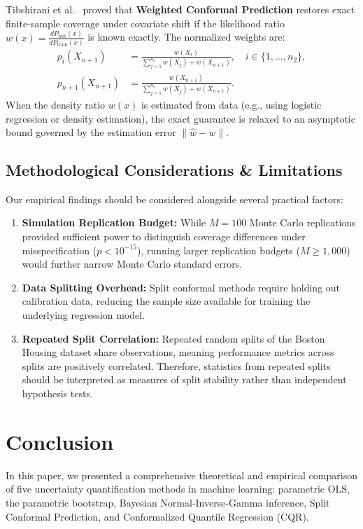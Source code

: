 \documentclass[journal]{IEEEtran}
\begin{document}
Tibshirani et al.~\cite{tibshirani2019} proved that \textbf{Weighted Conformal Prediction} restores exact finite-sample coverage under covariate shift if the likelihood ratio $w(x) = \frac{dP_{\text{test}}(x)}{dP_{\text{train}}(x)}$ is known exactly. The normalized weights are:
\begin{align}
p_i(X_{n+1}) &= \frac{w(X_i)}{\sum_{j=1}^{n_2} w(X_j) + w(X_{n+1})}, \quad i \in \{1, \dots, n_2\}, \\
p_{n+1}(X_{n+1}) &= \frac{w(X_{n+1})}{\sum_{j=1}^{n_2} w(X_j) + w(X_{n+1})}.
\end{align}
When the density ratio $w(x)$ is estimated from data (e.g., using logistic regression or density estimation), the exact guarantee is relaxed to an asymptotic bound governed by the estimation error $\|\hat{w} - w\|$.

\subsection{Methodological Considerations \& Limitations}
Our empirical findings should be considered alongside several practical factors:
\begin{enumerate}
    \item \textbf{Simulation Replication Budget:} While $M = 100$ Monte Carlo replications provided sufficient power to distinguish coverage differences under misspecification ($p < 10^{-15}$), running larger replication budgets ($M \ge 1,000$) would further narrow Monte Carlo standard errors.
    \item \textbf{Data Splitting Overhead:} Split conformal methods require holding out calibration data, reducing the sample size available for training the underlying regression model.
    \item \textbf{Repeated Split Correlation:} Repeated random splits of the Boston Housing dataset share observations, meaning performance metrics across splits are positively correlated. Therefore, statistics from repeated splits should be interpreted as measures of split stability rather than independent hypothesis tests.
\end{enumerate}

\section{Conclusion}\label{sec:conclusion}
In this paper, we presented a comprehensive theoretical and empirical comparison of five uncertainty quantification methods in machine learning: parametric OLS, the parametric bootstrap, Bayesian Normal-Inverse-Gamma inference, Split Conformal Prediction, and Conformalized Quantile Regression (CQR). 
\end{document}
